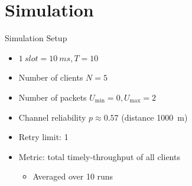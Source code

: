 \documentclass{beamer}
\begin{document}
\section{Simulation}
\begin{frame}{Simulation Setup}
  \begin{itemize}
    \item $\SI{1}{slot} = \SI{10}{ms}, T=10$
    \item Number of clients $N=5$
    \item Number of packets $U_\text{min}=0, U_\text{max}=2$
    \item Channel reliability $p\approx0.57$ (distance \SI{1000}{m})
    \item Retry limit: 1
    \item Metric: total timely-throughput of all clients
      \begin{itemize}
	\item Averaged over 10 runs
      \end{itemize}
  \end{itemize}
\end{frame}
\end{document}
